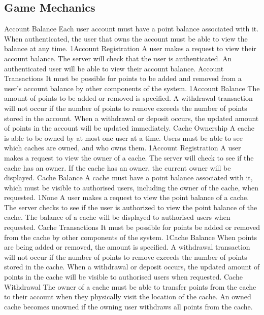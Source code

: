 	\subsection{Game Mechanics} %
		\funcreq %
			{Account Balance}
			{Each user account must have a point balance associated with it. 
			When authenticated, the user that owns the account must be able to
			view the balance at any time.}
			{1}{Account Registration}
			{A user makes a request to view their account balance.}
			{The server will check that the user is authenticated.}
			{An authenticated user will be able to view their account balance.}
		\funcreq %
			{Account Transactions}
			{It must be possible for points to be added and removed from a 
			user's account balance by other components of the system.}
			{1}{Account Balance}
			{The amount of points to be added or removed is specified.}
			{A withdrawal transaction will not occur if the number of points 
			to remove exceeds the number of points stored in the account.}
			{When a withdrawal or deposit occurs, the updated amount of points 
			in the account will be updated immediately.}
		\funcreq %
			{Cache Ownership}
			{A cache is able to be owned by at most one user at a time. Users 
			must be able to see which caches are owned, and who owns them.}
			{1}{Account Registration}
			{A user makes a request to view the owner of a cache.}
			{The server will check to see if the cache has an owner.}
			{If the cache has an owner, the current owner will be displayed.}
		\funcreq %
			{Cache Balance}
			{A cache must have a point balance associated with it, which must 
			be visible to authorised users, including the owner of the cache,
			when requested.}
			{1}{None}
			{A user makes a request to view the point balance of a cache.}
			{The server checks to see if the user is authorized to view the 
			point balance of the cache.}
			{The balance of a cache will be displayed to authorised users when 
			requested.}
		\funcreq %
			{Cache Transactions}
			{It must be possible for points be added or removed from the cache
			by other components of the system.}
			{1}{Cache Balance}
			{When points are being added or removed, the amount is specified.}
			{A withdrawal transaction will not occur if the number of points 
			to remove exceeds the number of points stored in the cache.}
			{When a withdrawal or deposit occurs, the updated amount of points 
			in the cache will be visible to authorised users when requested.}
		\funcreq %
			{Cache Withdrawal}
			{The owner of a cache must be able to transfer points from the 
			cache to their account when they physically visit the location of 
			the cache. An owned cache becomes unowned if the owning user 
			withdraws all points from the cache.}
